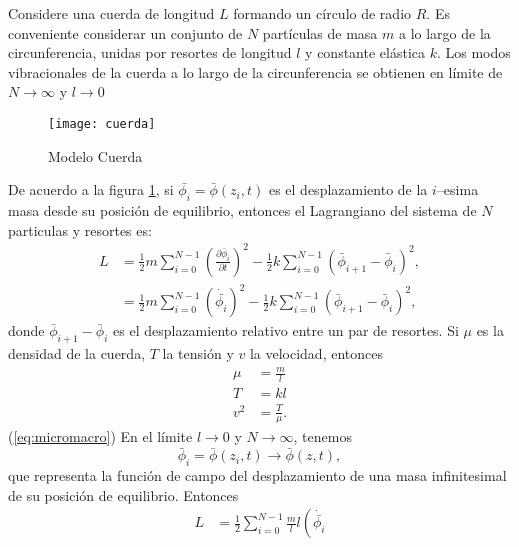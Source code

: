 \begin{frame}
Considere una cuerda de longitud $L$ formando un círculo de radio $R$.
Es conveniente considerar un conjunto de $N$ partículas de masa $m$ a
lo largo de la circunferencia, unidas por resortes de longitud $l$ y
constante elástica $k$. Los modos vibracionales de la cuerda a lo
largo de la circunferencia se obtienen en límite de $N\to\infty$ y $l\to0$ 

\begin{figure} %
  \centering %
  \texttt{[image: cuerda]} %
  \caption{Modelo Cuerda} %
  \label{fig:1string} %
\end{figure} %
De acuerdo a la figura 
\ref{fig:1string}, %
si $\bar{\phi_i}=\bar{\phi}(z_i,t)$ es el
desplazamiento de la $i$--esima masa desde su posición de equilibrio,
entonces el Lagrangiano del sistema de $N$ particulas y resortes es:
\begin{align}
  \label{eq:1strLsum} %
  L&=\frac{1}{2}m\sum_{i=0}^{N-1}
  \left(
\frac{\partial\bar\phi_i}{\partial t}
  \right)^2-\frac{1}{2}k\sum_{i=0}^{N-1}
  \left(
\bar\phi_{i+1}-\bar\phi_{i}
  \right)^2,\\
  \label{eq:1strLsumdot} 
&=\frac{1}{2}m\sum_{i=0}^{N-1}
  \left(
    \dot{\bar{\phi_i}}
  \right)^2-\frac{1}{2}k\sum_{i=0}^{N-1}
  \left(
\bar\phi_{i+1}-\bar\phi_{i}
  \right)^2,
\end{align}
donde $\bar\phi_{i+1}-\bar\phi_{i}$ es el desplazamiento relativo entre un par de resortes.
Si $\mu$ es la densidad de la cuerda, $T$ la tensión y $v$ la velocidad, entonces
\begin{align}
  \label{eq:micromacro}
  \mu&=\frac{m}{l}\nonumber\\
  T&=kl\\
  v^2&=\frac{T}{\mu}.\nonumber
\end{align}
(\ref{eq:micromacro})
En el límite $l\to0$ y $N\to\infty$, tenemos
\begin{equation}
  \label{eq:barf}
  \bar\phi_i=\bar\phi(z_i,t)\to\bar\phi(z,t),
\end{equation}
que representa la función de campo del desplazamiento de una masa
infinitesimal de su posición de equilibrio. Entonces
\begin{align}
L&=\frac{1}{2}\sum_{i=0}^{N-1}\frac{m}{l}l
  \left(
    \dot{\bar{\phi_i}}

\end{align}
\end{frame}
